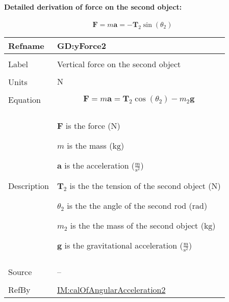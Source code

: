 \documentclass[12pt]{article}
\begin{document}
\paragraph{Detailed derivation of force on the second object:}
\label{GD:xForce2Deriv}
\begin{displaymath}
\symbf{F}=m \symbf{a}=-{\symbf{T}_{2}} \sin\left({θ_{2}}\right)
\end{displaymath}
\vspace{\baselineskip}
\noindent
\begin{minipage}{\textwidth}
\begin{tabular}{>{\raggedright}p{}>{\raggedright\arraybackslash}p{}}
\toprule \textbf{Refname} & \textbf{GD:yForce2}
\label{GD:yForce2}
\\ \midrule \\
Label & Vertical force on the second object
        
\\ \midrule \\
Units & ${\text{N}}$
        
\\ \midrule \\
Equation & \begin{displaymath}
           \symbf{F}=m \symbf{a}={\symbf{T}_{2}} \cos\left({θ_{2}}\right)-{m_{2}} \symbf{g}
           \end{displaymath}
\\ \midrule \\
Description & \begin{symbDescription}
              \item{$\symbf{F}$ is the force (${\text{N}}$)}
              \item{$m$ is the mass (${\text{kg}}$)}
              \item{$\symbf{a}$ is the acceleration ($\frac{\text{m}}{\text{s}^{2}}$)}
              \item{${\symbf{T}_{2}}$ is the the tension of the second object (${\text{N}}$)}
              \item{${θ_{2}}$ is the the angle of the second rod (${\text{rad}}$)}
              \item{${m_{2}}$ is the the mass of the second object (${\text{kg}}$)}
              \item{$\symbf{g}$ is the gravitational acceleration ($\frac{\text{m}}{\text{s}^{2}}$)}
              \end{symbDescription}
\\ \midrule \\
Source & --
         
\\ \midrule \\
RefBy & \hyperref[IM:calOfAngularAcceleration2]{IM:calOfAngularAcceleration2}
        
\\ \bottomrule
\end{tabular}
\end{minipage}
\end{document}
